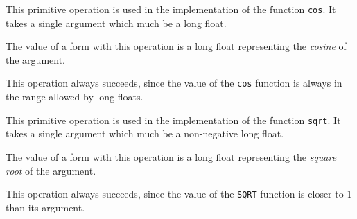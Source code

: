 
This primitive operation is used in the implementation of the
\commonlisp{} function \texttt{cos}.  It takes a single argument which
much be a long float.

The value of a form with this operation is a long float representing
the \emph{cosine} of the argument.

This operation always succeeds, since the value of the \texttt{cos}
function is always in the range allowed by long floats.


This primitive operation is used in the implementation of the
\commonlisp{} function \texttt{sqrt}.  It takes a single argument which
much be a non-negative long float.

The value of a form with this operation is a long float representing
the \emph{square root} of the argument.

This operation always succeeds, since the value of the \texttt{SQRT}
function is closer to $1$ than its argument.
